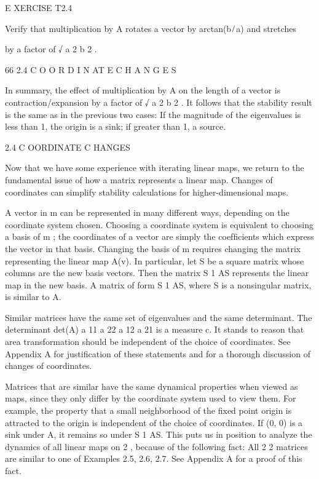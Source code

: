 \documentclass[12pt]{article}
\begin{document}
E XERCISE T2.4

Verify that multiplication by A rotates a vector by arctan(b ̸ a) and stretches

by a factor of √ a 2  b 2 .

66 2.4 C O O R D I N AT E C H A N G E S

In summary, the effect of multiplication by A on the length of a vector is contraction/expansion by a factor of √ a 2  b 2 . It 
follows that the stability result is the same as in the previous two cases: If the magnitude of the eigenvalues is less than 1, the 
origin is a sink; if greater than 1, a source.

2.4 C OORDINATE C HANGES

Now that we have some experience with iterating linear maps, we return to the fundamental issue of how a matrix represents a linear 
map. Changes of coordinates can simplify stability calculations for higher-dimensional maps.

A vector in  m can be represented in many different ways, depending on the coordinate system chosen. Choosing a coordinate system is 
equivalent to choosing a basis of  m ; the coordinates of a vector are simply the coefﬁcients which express the vector in that 
basis. Changing the basis of  m requires changing the matrix representing the linear map A(v). In particular, let S be a square 
matrix whose columns are the new basis vectors. Then the matrix S 1 AS represents the linear map in the new basis. A matrix of form S 
1 AS, where S is a nonsingular matrix, is similar to A.

Similar matrices have the same set of eigenvalues and the same determinant. The determinant det(A)  a 11 a 22  a 12 a 21 is a measure 
 c. It stands to reason that area transformation should be independent of the choice of coordinates. See Appendix A for justiﬁcation 
of these statements and for a thorough discussion of changes of coordinates.

Matrices that are similar have the same dynamical properties when viewed as maps, since they only differ by the coordinate system 
used to view them. For example, the property that a small neighborhood of the ﬁxed point origin is attracted to the origin is 
independent of the choice of coordinates. If (0, 0) is a sink under A, it remains so under S 1 AS. This puts us in position to 
analyze the dynamics of all linear maps on  2 , because of the following fact: All 2 2 matrices are similar to one of Examples 2.5, 
2.6, 2.7. See Appendix A for a proof of this fact.
\end{document}
